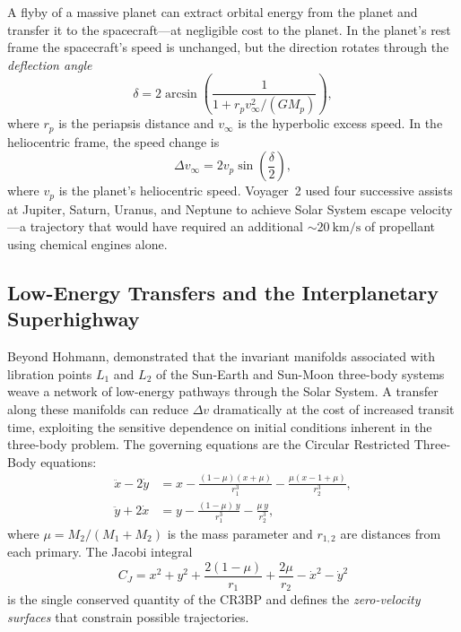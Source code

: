 \documentclass[12pt,a4paper]{article}
\begin{document}
A flyby of a massive planet can extract orbital energy from the planet and
transfer it to the spacecraft---at negligible cost to the planet. In the
planet's rest frame the spacecraft's speed is unchanged, but the direction
rotates through the \emph{deflection angle}
\begin{equation}
  \delta = 2\arcsin\!\left(\frac{1}{1 + r_p v_\infty^2/(GM_p)}\right),
  \label{eq:deflection}
\end{equation}
where $r_p$ is the periapsis distance and $v_\infty$ is the hyperbolic excess
speed. In the heliocentric frame, the speed change is
\begin{equation}
  \Delta v_\infty = 2v_p\sin\!\left(\frac{\delta}{2}\right),
  \label{eq:flyby}
\end{equation}
where $v_p$ is the planet's heliocentric speed. Voyager~2 used four successive
assists at Jupiter, Saturn, Uranus, and Neptune to achieve Solar System escape
velocity---a trajectory that would have required an additional
$\sim\SI{20}{\kilo\meter\per\second}$ of propellant using chemical engines alone.

\subsection{Low-Energy Transfers and the Interplanetary Superhighway}

Beyond Hohmann, \citet{Belbruno1987} demonstrated that the invariant manifolds
associated with libration points $L_1$ and $L_2$ of the Sun-Earth and
Sun-Moon three-body systems weave a network of low-energy pathways through
the Solar System. A transfer along these manifolds can reduce $\Delta v$
dramatically at the cost of increased transit time, exploiting the sensitive
dependence on initial conditions inherent in the three-body problem. The
governing equations are the Circular Restricted Three-Body equations:
\begin{align}
  \ddot{x} - 2\dot{y} &= x - \frac{(1-\mu)(x+\mu)}{r_1^3}
    - \frac{\mu(x-1+\mu)}{r_2^3}, \label{eq:cr3bp_x}\\
  \ddot{y} + 2\dot{x} &= y - \frac{(1-\mu)\,y}{r_1^3}
    - \frac{\mu\,y}{r_2^3}, \label{eq:cr3bp_y}
\end{align}
where $\mu = M_2/(M_1+M_2)$ is the mass parameter and $r_{1,2}$ are distances
from each primary. The Jacobi integral
\begin{equation}
  C_J = x^2 + y^2 + \frac{2(1-\mu)}{r_1} + \frac{2\mu}{r_2} - \dot{x}^2 - \dot{y}^2
  \label{eq:jacobi}
\end{equation}
is the single conserved quantity of the CR3BP and defines the \emph{zero-velocity
surfaces} that constrain possible trajectories.
\end{document}
